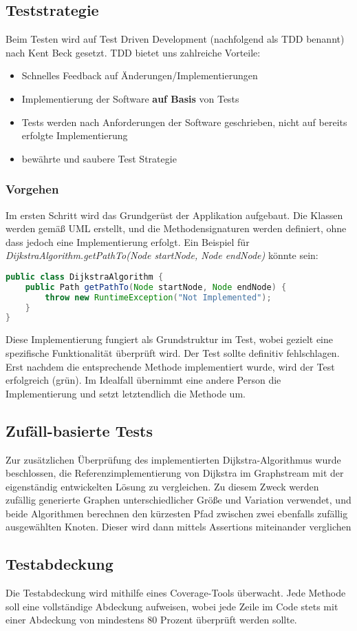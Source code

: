 \subsection{Teststrategie}
Beim Testen wird auf Test Driven Development (nachfolgend als TDD benannt) nach Kent Beck \cite{TDDBX2002} gesetzt. TDD bietet uns zahlreiche Vorteile:
\begin{itemize}
    \item Schnelles Feedback auf Änderungen/Implementierungen
    \item Implementierung der Software \textbf{auf Basis} von Tests
    \item Tests werden nach Anforderungen der Software geschrieben, nicht auf bereits erfolgte Implementierung
    \item bewährte und saubere Test Strategie
\end{itemize}

\subsubsection{Vorgehen}
Im ersten Schritt wird das Grundgerüst der Applikation aufgebaut. Die Klassen werden gemäß UML erstellt, und die Methodensignaturen werden definiert, ohne dass jedoch eine Implementierung erfolgt. Ein Beispiel für \textit{DijkstraAlgorithm.getPathTo(Node startNode, Node endNode)} könnte sein:
\begin{lstlisting}[language=Java ,caption=Beispielhafte Konstruktion des Gerüst einer Methode,captionpos=b]
public class DijkstraAlgorithm {
    public Path getPathTo(Node startNode, Node endNode) {
        throw new RuntimeException("Not Implemented");
    }
}
\end{lstlisting}
Diese Implementierung fungiert als Grundstruktur im Test, wobei gezielt eine spezifische Funktionalität überprüft wird. Der Test sollte definitiv fehlschlagen. Erst nachdem die entsprechende Methode implementiert wurde, wird der Test erfolgreich (grün). Im Idealfall übernimmt eine andere Person die Implementierung und setzt letztendlich die Methode um.

\subsection{Zufäll-basierte Tests}
Zur zusätzlichen Überprüfung des implementierten Dijkstra-Algorithmus wurde beschlossen, die Referenzimplementierung von Dijkstra im Graphstream mit der eigenständig entwickelten Lösung zu vergleichen. Zu diesem Zweck werden zufällig generierte Graphen unterschiedlicher Größe und Variation verwendet, und beide Algorithmen berechnen den kürzesten Pfad zwischen zwei ebenfalls zufällig ausgewählten Knoten. Dieser wird dann mittels Assertions miteinander verglichen

\subsection{Testabdeckung}
Die Testabdeckung wird mithilfe eines Coverage-Tools überwacht. Jede Methode soll eine vollständige Abdeckung aufweisen, wobei jede Zeile im Code stets mit einer Abdeckung von mindestens 80 Prozent überprüft werden sollte.